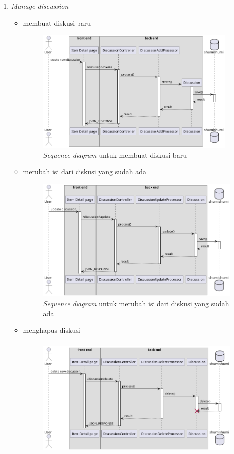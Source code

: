 \documentclass[a4paper]{article}
\begin{document}
\begin{enumerate}
\begin{enumerate}
        \item \textit{Manage discussion}
        \begin{itemize}
            \item membuat diskusi baru
            \begin{figure}[h]
                \centering
                \includegraphics*[height=6cm]{./diagram/sequence diagram/14. discussion/create discussion/create discussion.png}
                \caption{\textit{Sequence diagram} untuk membuat diskusi baru}
            \end{figure}
            \newpage
            \item merubah isi dari diskusi yang sudah ada
            \begin{figure}[h]
                \centering
                \includegraphics*[height=6cm]{./diagram/sequence diagram/14. discussion/edit discussion/edit discussion.png}
                \caption{\textit{Sequence diagram} untuk merubah isi dari diskusi yang sudah ada}
            \end{figure}
            \item menghapus diskusi
            \begin{figure}[h]
                \centering
                \includegraphics*[height=6cm]{./diagram/sequence diagram/14. discussion/delete discussion/delete discussion.png}

\end{figure}
\end{itemize}
\end{enumerate}
\end{enumerate}
\end{document}
